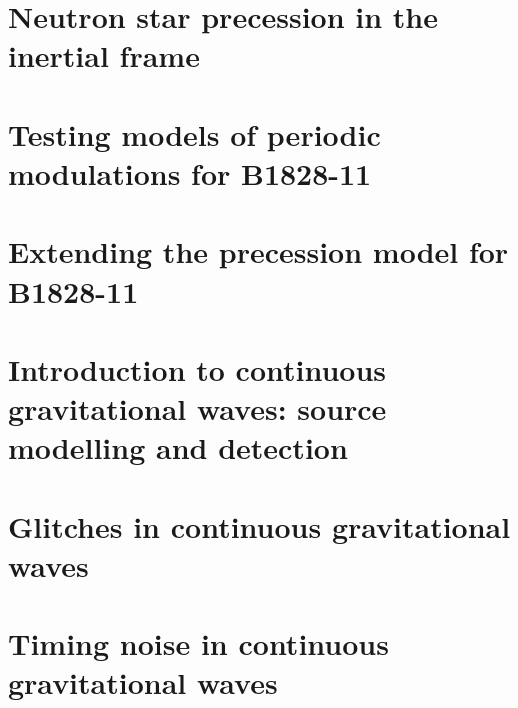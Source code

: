\documentclass[twoside]{thesis}
\begin{document}
\chapter{Neutron star precession in the inertial frame}
\label{sec: inertial frame}


\chapter{Testing models of periodic modulations for B1828-11}
\label{sec: testing models}


\chapter{Extending the precession model for B1828-11}
\label{sec: extending precession models}

\chapter{Introduction to continuous gravitational waves: source modelling and detection}
\label{sec: intro to cgw}


\chapter{Glitches in continuous gravitational waves}
\label{sec: glitches in cgw}

\chapter{Timing noise in continuous gravitational waves}
\label{sec: timing noise in cgw}





\end{document}
